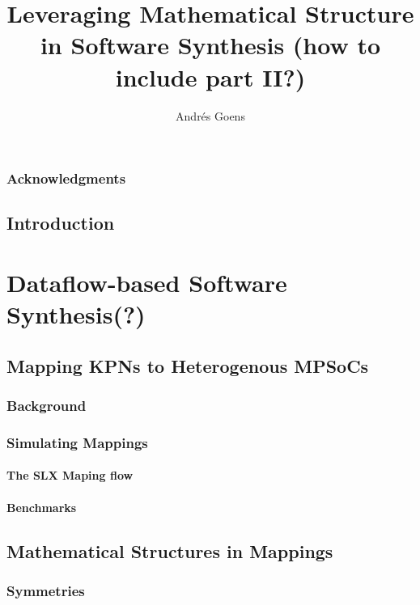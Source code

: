 \documentclass{report}
\title{Leveraging Mathematical Structure in Software Synthesis (how to include part II?)}
\author{Andr\'{e}s Goens}
\begin{document}

\date{}

\maketitle
\tableofcontents
\clearpage
\section*{Acknowledgments}


\chapter{Introduction}


\part{Dataflow-based Software Synthesis(?)}

\chapter{Mapping KPNs to Heterogenous MPSoCs}

\section{Background}

\section{Simulating Mappings}

\subsection{The SLX Maping flow}

\subsection{Benchmarks}


\chapter{Mathematical Structures in Mappings}

\section{Symmetries}
\end{document}
